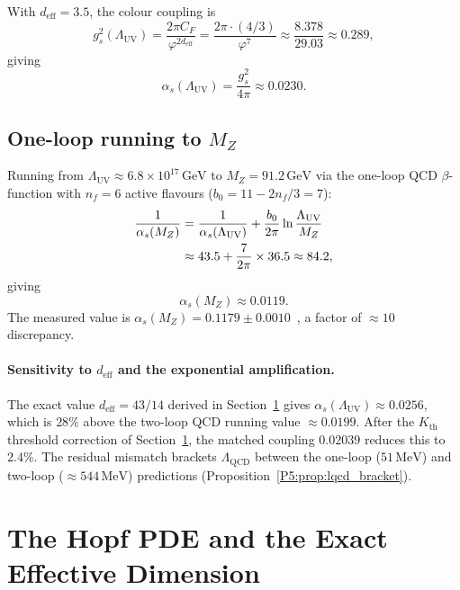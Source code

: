 \documentclass[11pt,a4paper]{article}
\theoremstyle{definition}
\theoremstyle{remark}
\newcommand{\vp}{\varphi}
\newcommand{\LUV}{\Lambda_{\mathrm{UV}}}
\newcommand{\LQCD}{\Lambda_{\mathrm{QCD}}}
\newcommand{\deff}{d_{\mathrm{eff}}}
\begin{document}
With $\deff=3.5$, the colour coupling is
\begin{equation}
  g_s^2(\LUV) = \frac{2\pi C_F}{\vp^{2\deff}}
              = \frac{2\pi\cdot(4/3)}{\vp^7}
              \approx \frac{8.378}{29.03} \approx 0.289,
  \label{P5:eq:gs_UV}
\end{equation}
giving
\begin{equation}
  \alpha_s(\LUV) = \frac{g_s^2}{4\pi} \approx 0.0230.
  \label{P5:eq:as_UV}
\end{equation}

\subsection{One-loop running to $M_Z$}

Running from $\LUV\approx6.8\times10^{17}\,\mathrm{GeV}$ to
$M_Z=91.2\,\mathrm{GeV}$ via the one-loop QCD $\beta$-function
with $n_f=6$ active flavours ($b_0 = 11 - 2n_f/3 = 7$):
\begin{align}
  \frac{1}{\alpha_s(M_Z)}
  &= \frac{1}{\alpha_s(\LUV)} + \frac{b_0}{2\pi}\ln\frac{\LUV}{M_Z}
  \notag \\
  &\approx 43.5 + \frac{7}{2\pi}\times 36.5
  \approx 84.2,
  \label{P5:eq:as_running}
\end{align}
giving
\begin{equation}
  \boxed{\alpha_s(M_Z) \approx 0.0119.}
  \label{P5:eq:as_mZ}
\end{equation}
The measured value is $\alpha_s(M_Z) = 0.1179\pm0.0010$~\cite{PDG2024},
a factor of $\approx10$ discrepancy.

\paragraph{Sensitivity to $\deff$ and the exponential amplification.}
The exact value $\deff=43/14$ derived in Section~\ref{P5:sec:deff}
gives $\alpha_s(\LUV)\approx0.0256$, which is $28\%$ above the
two-loop QCD running value $\approx0.0199$.
After the $K_{\mathrm{th}}$ threshold correction of Section~\ref{P5:sec:deff},
the matched coupling $0.02039$ reduces this to $2.4\%$.
The residual mismatch brackets $\LQCD$ between the one-loop
($51\,\mathrm{MeV}$) and two-loop ($\approx544\,\mathrm{MeV}$) predictions
(Proposition~\ref{P5:prop:lqcd_bracket}).

\section{The Hopf PDE and the Exact Effective Dimension}
\label{P5:sec:deff}
\end{document}
